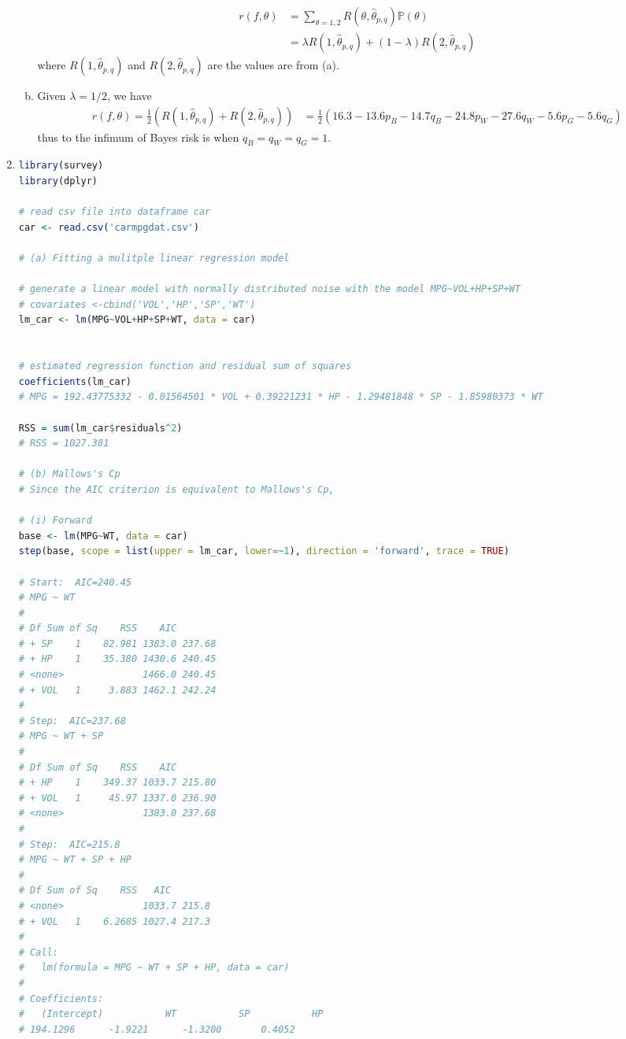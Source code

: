 \documentclass[a4paper,10pt]{article}
\theoremstyle{definition}
\begin{document}
\begin{enumerate}
\begin{enumerate}[(a)]
\begin{align*}
r(f,\theta) &= \sum_{\theta=1,2}R(\theta,\hat{\theta}_{p,q})\mathbb{P}(\theta)\\
&= \lambda R(1,\hat{\theta}_{p,q})+ (1-\lambda)R(2,\hat{\theta}_{p,q})
\end{align*}
where $R(1,\hat{\theta}_{p,q})$ and $R(2,\hat{\theta}_{p,q})$ are the values are from (a).
\item Given $\lambda = 1/2$, we have
\begin{align*}
r(f,\theta)=\frac{1}{2} \left(R(1,\hat{\theta}_{p,q})+ R(2,\hat{\theta}_{p,q})\right) &=\frac{1}{2}\left(16.3-13.6p_B-14.7q_B-24.8p_W-27.6q_W-5.6p_G-5.6q_G\right)
\end{align*}
thus to the infimum of Bayes risk is when $q_B = q_W = q_G =1$.
\end{enumerate}

\newpage
\item


\begin{lstlisting}[language=R,commentstyle=\fontseries{lc}\color{gray}]
library(survey)
library(dplyr)

# read csv file into dataframe car
car <- read.csv('carmpgdat.csv')

# (a) Fitting a mulitple linear regression model

# generate a linear model with normally distributed noise with the model MPG~VOL+HP+SP+WT
# covariates <-cbind('VOL','HP','SP','WT')
lm_car <- lm(MPG~VOL+HP+SP+WT, data = car)


# estimated regression function and residual sum of squares
coefficients(lm_car)
# MPG = 192.43775332 - 0.01564501 * VOL + 0.39221231 * HP - 1.29481848 * SP - 1.85980373 * WT

RSS = sum(lm_car$residuals^2)
# RSS = 1027.381

# (b) Mallows's Cp
# Since the AIC criterion is equivalent to Mallows's Cp, 

# (i) Forward
base <- lm(MPG~WT, data = car)
step(base, scope = list(upper = lm_car, lower=~1), direction = 'forward', trace = TRUE)

# Start:  AIC=240.45
# MPG ~ WT
# 
# Df Sum of Sq    RSS    AIC
# + SP    1    82.981 1383.0 237.68
# + HP    1    35.380 1430.6 240.45
# <none>              1466.0 240.45
# + VOL   1     3.883 1462.1 242.24
# 
# Step:  AIC=237.68
# MPG ~ WT + SP
# 
# Df Sum of Sq    RSS    AIC
# + HP    1    349.37 1033.7 215.80
# + VOL   1     45.97 1337.0 236.90
# <none>              1383.0 237.68
# 
# Step:  AIC=215.8
# MPG ~ WT + SP + HP
# 
# Df Sum of Sq    RSS   AIC
# <none>              1033.7 215.8
# + VOL   1    6.2685 1027.4 217.3
# 
# Call:
#   lm(formula = MPG ~ WT + SP + HP, data = car)
# 
# Coefficients:
#   (Intercept)           WT           SP           HP  
# 194.1296      -1.9221      -1.3200       0.4052


\end{lstlisting}
\end{enumerate}
\end{document}
